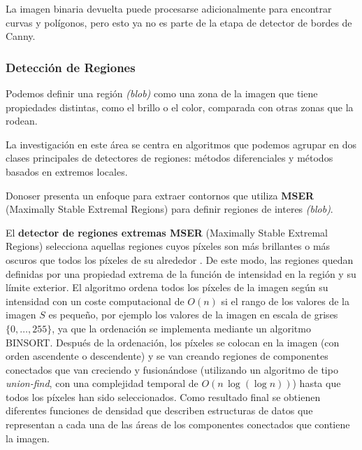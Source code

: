La imagen binaria devuelta puede procesarse adicionalmente para encontrar curvas y polígonos, pero esto ya no es parte de la etapa de detector de bordes de Canny.

\subsubsection{Detección de Regiones}
Podemos definir una región \emph{(blob)} como una zona de la imagen que tiene propiedades distintas, como el brillo o el color, comparada con otras zonas que la rodean.   


La investigación en este área se centra en algoritmos que podemos agrupar en dos clases principales de detectores de regiones: métodos diferenciales y métodos basados en extremos locales.

Donoser \cite{Donoser} presenta un enfoque para extraer contornos que utiliza \textbf{MSER} (Maximally Stable Extremal Regions) para definir regiones de interes \emph{(blob)}.

El \textbf{detector de regiones extremas MSER} (Maximally Stable Extremal Regions) selecciona aquellas regiones cuyos píxeles son más brillantes o más oscuros que todos los píxeles de su alrededor \cite{Matas}. De este modo, las regiones quedan definidas por una propiedad extrema de la función de intensidad en la región y su límite exterior. 
El algoritmo ordena todos los píxeles de la imagen según su intensidad con un coste computacional de $O(n)$ si el rango de los valores de la imagen $S$ es pequeño, por ejemplo los valores de la imagen en escala de grises $\lbrace 0,\ldots,255\rbrace$, ya que la ordenación se implementa mediante un algoritmo BINSORT. Después de la ordenación, los píxeles se colocan en la imagen (con orden ascendente o descendente) y se van creando regiones de componentes conectados que van creciendo y fusionándose (utilizando un algoritmo de tipo \emph{union-find}, con una complejidad temporal de $O(n\,\log(\log n))$) hasta que todos los píxeles han sido seleccionados. Como resultado final se obtienen diferentes funciones de densidad que describen estructuras de datos que representan a cada una de las áreas de los componentes conectados que contiene la imagen.

